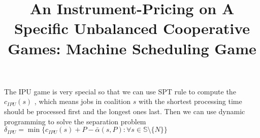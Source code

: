 \documentclass[UTF8]{article}
\title{An Instrument-Pricing on A Specific Unbalanced Cooperative Games: Machine Scheduling Game}
\begin{document}
\maketitle{}









%














The IPU game is very special so that we can use SPT rule to compute the $c_{IPU}(s)$ , which means jobs in coalition $s$ with the shortest processing time should be processed first and the longest ones last. Then we can use dynamic programming to solve the separation problem $\delta_{IPU} = \min \big\{c_{IPU}(s)+P-\bar{\alpha}(s,P): \forall s \in \mathbb{S} \setminus \{N\}\big\} $
\end{document}
